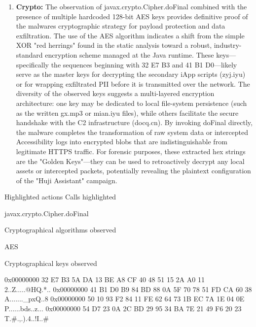 \documentclass[
]{article}
\newenvironment{Shaded}{}{}
\newcommand{\NormalTok}[1]{#1}
\begin{document}
\begin{enumerate}
\def\labelenumi{\arabic{enumi}.}
\item
  \textbf{Crypto:} The observation of javax.crypto.Cipher.doFinal
  combined with the presence of multiple hardcoded 128-bit AES keys
  provides definitive proof of the malware\textquotesingle s
  cryptographic strategy for payload protection and data exfiltration.
  The use of the AES algorithm indicates a shift from the simple XOR
  "red herrings" found in the static analysis toward a robust,
  industry-standard encryption scheme managed at the Java runtime. These
  keys---specifically the sequences beginning with 32 E7 B3 and 41 B1
  D0---likely serve as the master keys for decrypting the secondary iApp
  scripts (zyj.iyu) or for wrapping exfiltrated PII before it is
  transmitted over the network. The diversity of the observed keys
  suggests a multi-layered encryption architecture: one key may be
  dedicated to local file-system persistence (such as the written gx.mp3
  or mian.iyu files), while others facilitate the secure handshake with
  the C2 infrastructure (docq.cn). By invoking doFinal directly, the
  malware completes the transformation of raw system data or intercepted
  Accessibility logs into encrypted blobs that are indistinguishable
  from legitimate HTTPS traffic. For forensic purposes, these extracted
  hex strings are the "Golden Keys"---they can be used to retroactively
  decrypt any local assets or intercepted packets, potentially revealing
  the plaintext configuration of the "Huji Assistant" campaign.
\end{enumerate}

\begin{Shaded}
\begin{Highlighting}[]
\NormalTok{Highlighted actions}
\NormalTok{Calls highlighted}

\NormalTok{    javax.crypto.Cipher.doFinal}

\NormalTok{Cryptographical algorithms observed}

\NormalTok{    AES}

\NormalTok{Cryptographical keys observed}

\NormalTok{    0x00000000 32 E7 B3 5A DA 13 BE A8 CF 40 48 51 15 2A A0 11 2..Z.....@HQ.*..}
\NormalTok{    0x00000000 41 B1 D0 B9 84 BD 88 0A 5F 70 78 51 FD CA 60 38 A.......\_pxQ..\textasciigrave{}8}
\NormalTok{    0x00000000 50 10 93 F2 84 11 FE 62 64 73 1B EC 7A 1E 04 0E P......bds..z...}
\NormalTok{    0x00000000 54 D7 23 0A 2C BD 29 95 34 BA 7E 21 49 F6 20 23 T.\#.,.).4..!I..\#}
\end{Highlighting}
\end{Shaded}
\end{document}
